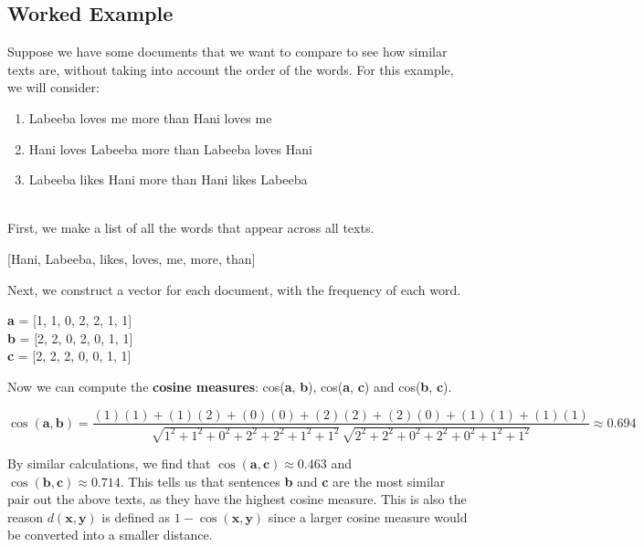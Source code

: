 \documentclass[11pt,fleqn]{book} %
\begin{document}
\newpage

\subsection*{Worked Example}
Suppose we have some documents that we want to compare to see how similar texts are, without taking into account the order of the words. For this example, we will consider:\\

\begin{enumerate}[label=(\alph*)]
	\item Labeeba loves me more than Hani loves me
	\item Hani loves Labeeba more than Labeeba loves Hani
	\item Labeeba likes Hani more than Hani likes Labeeba
\end{enumerate}

\ \\ \noindent
First, we make a list of all the words that appear across all texts.
\begin{center}
	[Hani, Labeeba, likes, loves, me, more, than]
\end{center}

\noindent
Next, we construct a vector for each document, with the frequency of each word.
\begin{center}
	\textbf{a} = [1, 1, 0, 2, 2, 1, 1]\\
	\textbf{b} = [2, 2, 0, 2, 0, 1, 1]\\
	\textbf{c} = [2, 2, 2, 0, 0, 1, 1]\\
\end{center}

\noindent
Now we can compute the \textbf{cosine measures}: cos(\textbf{a}, \textbf{b}), cos(\textbf{a}, \textbf{c}) and cos(\textbf{b}, \textbf{c}).

\begin{equation*}
	\cos(\mathbf{a}, \mathbf{b}) = \frac{(1)(1) + (1)(2) + (0)(0) + (2)(2) + (2)(0) + (1)(1) + (1)(1)}{\sqrt{1^2 + 1^2 + 0^2 + 2^2 + 2^2 + 1^2 + 1^2} \, \sqrt{2^2 + 2^2 + 0^2 + 2^2 + 0^2 + 1^2 + 1^2}} \approx 0.694
\end{equation*}

\noindent
By similar calculations, we find that $\cos(\mathbf{a}, \mathbf{c}) \approx 0.463$ and $\cos(\mathbf{b}, \mathbf{c}) \approx 0.714$. This tells us that sentences \textbf{b} and \textbf{c} are the most similar pair out the above texts, as they have the highest cosine measure. This is also the reason $d(\mathbf{x}, \mathbf{y})$ is defined as $1 - \cos(\mathbf{x}, \mathbf{y})$ since a larger cosine measure would be converted into a smaller distance.
\end{document}
